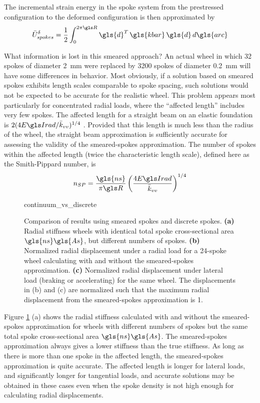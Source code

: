 \documentclass[\rootdir/thesis.tex]{subfiles}
\begin{document}
The incremental strain energy in the spoke system from the prestressed configuration to the deformed configuration is then approximated by
\begin{equation}
\label{eq:dU_spokes_cont}
\bar{U}_{spokes}^{\delta} = \frac{1}{2}\int_0^{2\pi \R} \gls{d}^T\, \gls{kbar}\, \gls{d} \, d\gls{arc}
\end{equation}

What information is lost in this smeared approach? An actual wheel in which 32 spokes of diameter \SI{2}{mm} were replaced by 3200 spokes of diameter \SI{0.2}{mm} will have some differences in behavior. Most obviously, if a solution based on smeared spokes exhibits length scales comparable to spoke spacing, such solutions would not be expected to be accurate for the realistic wheel. This problem appears most particularly for concentrated radial loads, where the ``affected length'' includes very few spokes. The affected length for a straight beam on an elastic foundation is $2(4\EIr/\kvv)^{1/4}$ \cite{Hetenyi1946}. Provided that this length is much less than the radius of the wheel, the straight beam approximation is sufficiently accurate for assessing the validity of the smeared-spokes approximation. The number of spokes within the affected length (twice the characteristic length scale), defined here as the Smith-Pippard number, is
\begin{equation}
n_{SP} = \frac{\gls{ns}}{\pi \R} \left(\frac{4\EIr}{\kvv}\right)^{1/4}
\end{equation}

\begin{figure}[t]
\centering
{continuum_vs_discrete}
\caption{Comparison of results using smeared spokes and discrete spokes. \textbf{(a)} Radial stiffness wheels with identical total spoke cross-sectional area $\gls{ns}\gls{As}$, but different numbers of spokes. \textbf{(b)} Normalized radial displacement under a radial load for a 24-spoke wheel calculating with and without the smeared-spokes approximation. \textbf{(c)} Normalized radial displacement under lateral load (braking or accelerating) for the same wheel. The displacements in (b) and (c) are normalized such that the maximum radial displacement from the smeared-spokes approximation is 1.}
\label{fig:continuum_vs_discrete}
\end{figure}

Figure \ref{fig:continuum_vs_discrete} (a) shows the radial stiffness calculated with and without the smeared-spokes approximation for wheels with different numbers of spokes but the same total spoke cross-sectional area $\gls{ns}\gls{As}$. The smeared-spokes approximation always gives a lower stiffness than the true stiffness. As long as there is more than one spoke in the affected length, the smeared-spokes approximation is quite accurate. The affected length is longer for lateral loads, and significantly longer for tangential loads, and accurate solutions may be obtained in these cases even when the spoke density is not high enough for calculating radial displacements.
\end{document}
